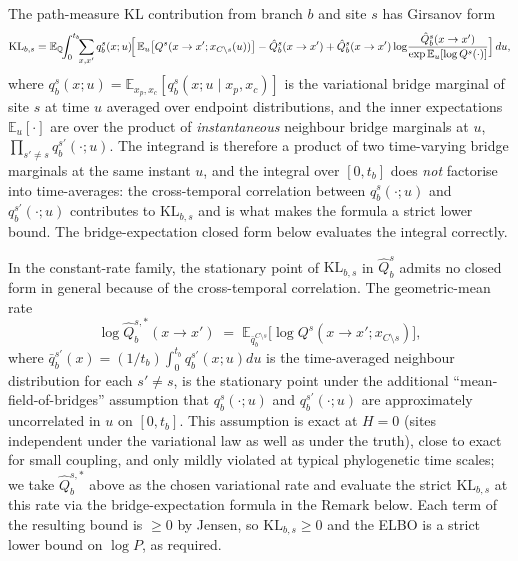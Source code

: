 \begin{proposition}
The path-measure KL contribution from branch $b$ and site $s$ has
Girsanov form
\[
    \mathrm{KL}_{b, s} = \mathbb{E}_{\mathbb{Q}}\!\!\int_0^{t_b}\!\!
    \sum_{x, x'} q^s_b(x; u)
    \!\Bigl[\, \mathbb{E}_{u}\bigl[Q^s(x \to x'; x_{C \setminus s}(u))\bigr]
    - \hat Q^s_b(x \to x')
    + \hat Q^s_b(x \to x') \log\!\frac{\hat Q^s_b(x \to x')}{\exp \mathbb{E}_{u}[\log Q^s(\cdot)]} \Bigr]\, du,
\]
where $q^s_b(x; u) = \mathbb{E}_{x_p, x_c}[q^s_b(x; u \mid x_p, x_c)]$
is the variational bridge marginal of site $s$ at time $u$ averaged
over endpoint distributions, and the inner expectations
$\mathbb{E}_{u}[\cdot]$ are over the product of \emph{instantaneous}
neighbour bridge marginals at $u$,
$\prod_{s' \neq s} q^{s'}_b(\cdot; u)$. The integrand is therefore a
product of two time-varying bridge marginals at the same instant
$u$, and the integral over $[0, t_b]$ does \emph{not} factorise into
time-averages: the cross-temporal correlation between
$q^s_b(\cdot; u)$ and $q^{s'}_b(\cdot; u)$ contributes to
$\mathrm{KL}_{b,s}$ and is what makes the formula a strict lower
bound. The bridge-expectation closed form below evaluates the integral
correctly.

In the constant-rate family, the stationary point of
$\mathrm{KL}_{b,s}$ in $\hat Q^s_b$ admits no closed form in general
because of the cross-temporal correlation. The geometric-mean rate
\[
    \log \hat Q^{s, *}_b(x \to x') \;=\;
    \mathbb{E}_{\bar q^{C \setminus s}_b}\!\bigl[\log Q^s(x \to x'; x_{C \setminus s})\bigr],
\]
where $\bar q^{s'}_b(x) = (1/t_b) \int_0^{t_b} q^{s'}_b(x; u) du$
is the time-averaged neighbour distribution for each $s' \neq s$,
is the stationary point under the additional ``mean-field-of-bridges''
assumption that $q^s_b(\cdot; u)$ and $q^{s'}_b(\cdot; u)$ are
approximately uncorrelated in $u$ on $[0, t_b]$. This assumption is
exact at $H = 0$ (sites independent under the variational law as
well as under the truth), close to exact for small coupling, and
only mildly violated at typical phylogenetic time scales; we take
$\hat Q^{s, *}_b$ above as the chosen variational rate and evaluate
the strict $\mathrm{KL}_{b, s}$ at this rate via the bridge-expectation
formula in the Remark below. Each term of the resulting bound is
$\geq 0$ by Jensen, so $\mathrm{KL}_{b, s} \geq 0$ and the ELBO is a
strict lower bound on $\log P$, as required.
\end{proposition}

